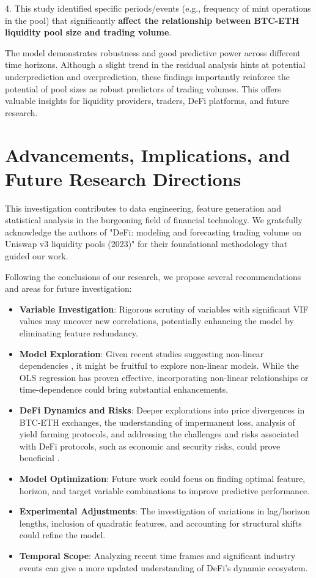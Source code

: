 \documentclass{article}
\begin{document}
4. This study identified specific periods/events (e.g., frequency of mint operations in the pool) that significantly \textbf{affect the relationship between BTC-ETH liquidity pool size and trading volume}.

The model demonstrates robustness and good predictive power across different time horizons. Although a slight trend in the residual analysis hints at potential underprediction and overprediction, these findings importantly reinforce the potential of pool sizes as robust predictors of trading volumes. This offers valuable insights for liquidity providers, traders, DeFi platforms, and future research.

\section{Advancements, Implications, and Future Research Directions}

This investigation contributes to data engineering, feature generation and statistical analysis in the burgeoning field of financial technology. We gratefully acknowledge the authors of "DeFi: modeling and forecasting trading volume on Uniswap v3 liquidity pools (2023)" \cite{Miori2023} for their foundational methodology that guided our work.

Following the conclusions of our research, we propose several recommendations and areas for future investigation:

\begin{itemize}
\item \textbf{Variable Investigation}: Rigorous scrutiny of variables with significant VIF values may uncover new correlations, potentially enhancing the model by eliminating feature redundancy.
\item \textbf{Model Exploration}: Given recent studies suggesting non-linear dependencies \cite{Makarov2022,Miori2023}, it might be fruitful to explore non-linear models. While the OLS regression has proven effective, incorporating non-linear relationships or time-dependence could bring substantial enhancements.
\item \textbf{DeFi Dynamics and Risks}: Deeper explorations into price divergences in BTC-ETH exchanges, the understanding of impermanent loss, analysis of yield farming protocols, and addressing the challenges and risks associated with DeFi protocols, such as economic and security risks, could prove beneficial \cite{Elsts2021, Xu2023}.
\item \textbf{Model Optimization}: Future work could focus on finding optimal feature, horizon, and target variable combinations to improve predictive performance.
\item \textbf{Experimental Adjustments}: The investigation of variations in lag/horizon lengths, inclusion of quadratic features, and accounting for structural shifts could refine the model.
\item \textbf{Temporal Scope}: Analyzing recent time frames and significant industry events can give a more updated understanding of DeFi's dynamic ecosystem.
\end{itemize}
\end{document}
